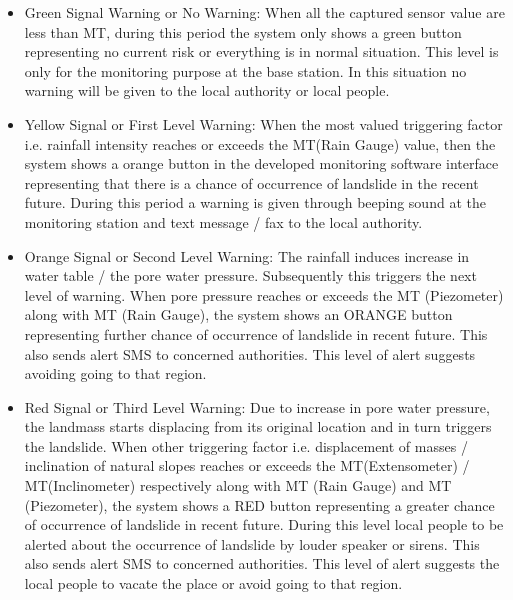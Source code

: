 \documentclass[conference]{IEEEtran}
\begin{document}
\begin{itemize}
\item Green Signal Warning or No Warning: When all the captured sensor value are less than MT, during this period the system only shows a green button representing no current risk or everything is in normal situation. This level is only for the monitoring purpose at the base station. In this situation no warning will be given to the local authority or local people.
\item Yellow Signal or First Level Warning: When the most valued triggering factor i.e. rainfall intensity reaches or exceeds the MT(Rain Gauge) value, then the system shows a orange button in the developed monitoring software interface representing that there is a chance of occurrence of landslide in the recent future. During this period a warning is given through beeping sound at the monitoring station and text message / fax to the local authority. 
\item Orange Signal or Second Level Warning: The rainfall induces increase in water table / the pore water pressure. Subsequently this triggers the next level of warning. When pore pressure reaches or exceeds the MT (Piezometer) along with MT (Rain Gauge), the system shows an ORANGE button representing further chance of occurrence of landslide in recent future. This also sends alert SMS to concerned authorities. This level of alert suggests avoiding going to that region.
\item Red Signal or Third Level Warning: Due to increase in pore water pressure, the landmass starts displacing from its original location and in turn triggers the landslide. When other triggering factor i.e. displacement of masses / inclination of natural slopes reaches or exceeds the MT(Extensometer) / MT(Inclinometer)  respectively along with MT (Rain Gauge) and MT (Piezometer), the system shows a RED button representing a greater chance of occurrence of landslide in recent future. During this level local people to be alerted about the occurrence of landslide by louder speaker or sirens. This also sends alert SMS to concerned authorities. This level of alert suggests the local people to vacate the place or avoid going to that region.
\end{itemize}
\end{document}
